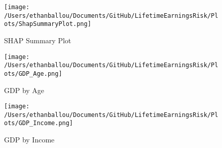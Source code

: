 \documentclass[12pt]{article}
\begin{document}
\begin{figure}[H]
    \centering
    \texttt{[image: /Users/ethanballou/Documents/GitHub/LifetimeEarningsRisk/Plots/ShapSummaryPlot.png]}
    \caption{SHAP Summary Plot}
\end{figure}



\begin{figure}[H]
    \centering
    \begin{minipage}{0.49\textwidth}
        \centering
        \texttt{[image: /Users/ethanballou/Documents/GitHub/LifetimeEarningsRisk/Plots/GDP\_Age.png]}
        \caption{GDP by Age}
    \end{minipage}
    \hfill
    \begin{minipage}{0.49\textwidth}
        \centering
        \texttt{[image: /Users/ethanballou/Documents/GitHub/LifetimeEarningsRisk/Plots/GDP\_Income.png]}
        \caption{GDP by Income}
    \end{minipage}
\end{figure}







\end{document}

